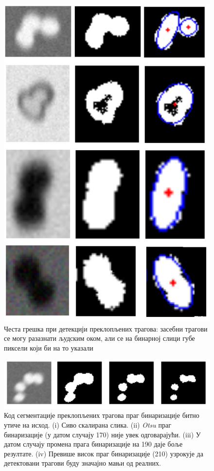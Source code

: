 \documentclass[11pt,a4paper,serbian,oneside]{book}
\begin{document}
\begin{figure}[H]
\begin{center}
\includegraphics[width=150mm]{images/error01.png}
\end{center}
\caption{Честа грешка при детекцији преклопљених трагова: засебни трагови се могу разазнати људским оком, али се на бинарној слици губе пиксели који би на то указали}
\label{fig:error_overlapped}
\end{figure}

\begin{figure}[H]
\begin{center}
\includegraphics[width=150mm]{images/binthresh.png}
\end{center}
\caption{Код сегментације преклопљених трагова праг бинаризације битно утиче на исход. (i) Сиво скалирана слика. (ii) \textit{Otsu}  праг бинаризације (у датом случају 170) није увек одговарајући. (iii) У датом случају промена прага бинаризације на 190 даје боље резултате. (iv) Превише висок праг бинаризације (210) узрокује да детектовани трагови буду значајно мањи од реалних. }
\label{fig:binthresh}
\end{figure}
\end{document}

